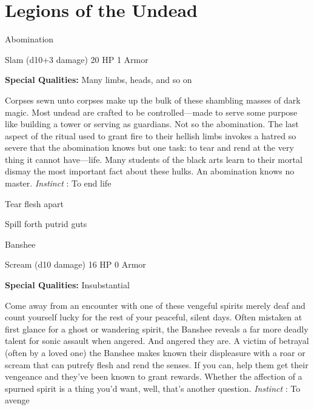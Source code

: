 \chapter{Legions of the Undead}
   
 


\startMonsterName
Abomination	 
\stopMonsterName
 

Slam (d10+3 damage)	20 HP	1 Armor

 


 
\startMonsterQualities
{\bf Special Qualities:}  Many limbs, heads, and so on
\stopMonsterQualities
 
\startMonsterDescription
Corpses sewn unto corpses make up the bulk of these shambling masses of dark magic.  Most undead are crafted to be controlled—made to serve some purpose like building a tower or serving as guardians.  Not so the abomination.  The last aspect of the ritual used to grant fire to their hellish limbs invokes a hatred so severe that the abomination knows but one task: to tear and rend at the very thing it cannot have—life.  Many students of the black arts learn to their mortal dismay the most important fact about these hulks. An abomination knows no master. {\em Instinct} : To end life
\stopMonsterDescription
 
\startitemize[1,packed]

\item Tear flesh apart

 
\item Spill forth putrid guts


\stopitemize
 
\startMonsterName
Banshee	 
\stopMonsterName
 

Scream (d10 damage)	16 HP	0 Armor

 


 
\startMonsterQualities
{\bf Special Qualities:}  Insubstantial
\stopMonsterQualities
 
\startMonsterDescription
Come away from an encounter with one of these vengeful spirits merely deaf and count yourself lucky for the rest of your peaceful, silent days.  Often mistaken at first glance for a ghost or wandering spirit, the Banshee reveals a far more deadly talent for sonic assault when angered.  And angered they are. A victim of betrayal (often by a loved one) the Banshee makes known their displeasure with a roar or scream that can putrefy flesh and rend the senses.  If you can, help them get their vengeance and they’ve been known to grant rewards.  Whether the affection of a spurned spirit is a thing you’d want, well, that’s another question. {\em Instinct} : To avenge
\stopMonsterDescription
 
